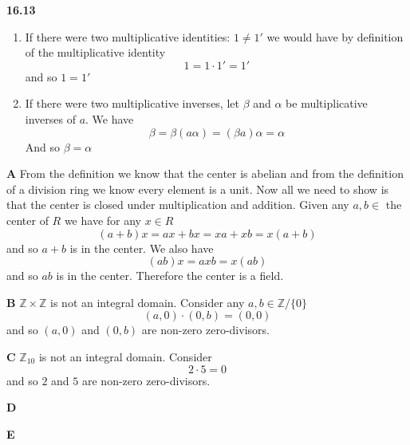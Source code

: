 \documentclass[12pt]{article}
\newenvironment{ques}{\vspace{2 ex}}{\vspace{2 ex}}
\theoremstyle{definition}
\begin{document}
\begin{ques}
	\textbf{16.13}
		\begin{enumerate}
			\item
				If there were two multiplicative identities: $1
				\neq 1'$ we would have by definition of the
				multiplicative identity
				$$1 = 1\cdot1' = 1'$$
				and so $1 = 1'$
			\item
				If there were two multiplicative inverses, let
				$\beta$ and $\alpha$ be multiplicative
				inverses of $a$. We have
				$$\beta = \beta(a \alpha) = (\beta a)\alpha =
				\alpha$$
				And so $\beta = \alpha$
		\end{enumerate}
\end{ques}

\begin{ques}
	\textbf{A}
		From the definition we know that the center is abelian and from
		the definition of a division ring we know every element is a
		unit. Now all we need to show is that the center is closed
		under multiplication and addition. Given any $a, b \in $ the
		center of $R$ we have for any $x \in R$
		$$(a + b)x = ax + bx = xa + xb = x(a + b)$$ 
		and so $a + b$ is in the center. We also have
		$$(ab)x = axb = x(ab)$$
		and so $ab$ is in the center. Therefore the center is a field.
\end{ques}

\begin{ques}
	\textbf{B}
		$\mathbb Z \times \mathbb Z$ is not an integral domain.
		Consider any $a, b \in \mathbb Z / \{0\}$
		$$(a, 0) \cdot (0, b) = (0,0)$$
		and so $(a,0)$ and $(0,b)$ are non-zero zero-divisors.
\end{ques}

\begin{ques}
	\textbf{C}
		$\mathbb Z_{10}$ is not an integral domain. Consider
		$$2 \cdot 5 = 0$$
		and so $2$ and $5$ are non-zero zero-divisors.

\end{ques}

\begin{ques}
	\textbf{D}
		
\end{ques}

\begin{ques}
	\textbf{E}
\end{ques}
\end{document}
